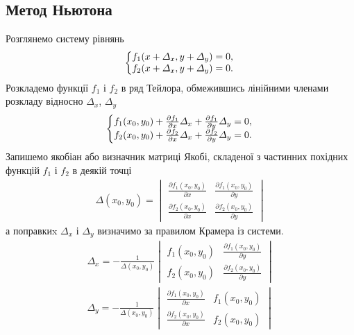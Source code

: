 \documentclass{article}
\begin{document}
\begin{large}
		\subsection*{Метод Ньютона}
		Розглянемо систему рівнянь
		\begin{gather}
			\left\{\begin{array}{@{}l@{}}
				f_1(x + \varDelta_x, y + \varDelta_y) = 0,\\\nonumber
				f_2(x + \varDelta_x, y + \varDelta_y) = 0.\nonumber
			\end{array}\right.\,
		\end{gather}
		Розкладемо функції $f_1$ і $f_2$ в ряд Тейлора, обмежившись лінійними членами розкладу відносно $\varDelta_x$, $\varDelta_y$
		\begin{gather}
			\left\{\begin{array}{@{}l@{}}
				f_1(x_0, y_0) + \frac{\partial f_1}{\partial x}\varDelta_x + \frac{\partial f_1}{\partial y}\varDelta_y = 0,\\\nonumber
				f_2(x_0, y_0) + \frac{\partial f_2}{\partial x}\varDelta_x + \frac{\partial f_2}{\partial y}\varDelta_y = 0.\nonumber
			\end{array}\right.\,
		\end{gather}
		Запишемо якобіан або визначник матриці Якобі, складеної з частинних
		похідних функцій $f_1$ і $f_2$ в деякій точці
		\begin{gather}
			\varDelta(x_0, y_0)=
			\begin{vmatrix}
				\frac{\partial f_1(x_0, y_0)}{\partial x} & \frac{\partial f_1(x_0, y_0)}{\partial y}\\
				\frac{\partial f_2(x_0, y_0)}{\partial x} & \frac{\partial f_2(x_0, y_0)}{\partial y}
			\end{vmatrix}
			\nonumber
		\end{gather}
		а поправкиx $\varDelta_x$ і $\varDelta_y$ визначимо за правилом Крамера із системи.
		\begin{gather}
			\varDelta_x=-\frac{1}{\varDelta(x_0,y_0)}
			\begin{vmatrix}\nonumber
				f_1(x_0,y_0) & \frac{\partial f_1(x_0, y_0)}{\partial y}\\
				f_2(x_0, y_0) & \frac{\partial f_2(x_0, y_0)}{\partial y}
			\end{vmatrix}\\\nonumber
			\varDelta_y=-
			\frac{1}{\varDelta(x_0,y_0)}
			\begin{vmatrix}
				\frac{\partial f_1(x_0, y_0)}{\partial x} & f_1(x_0, y_0)\\
				\frac{\partial f_2(x_0, y_0)}{\partial x} & f_2(x_0, y_0)
			\end{vmatrix}\nonumber
		\end{gather}
		

\end{large}
\end{document}
